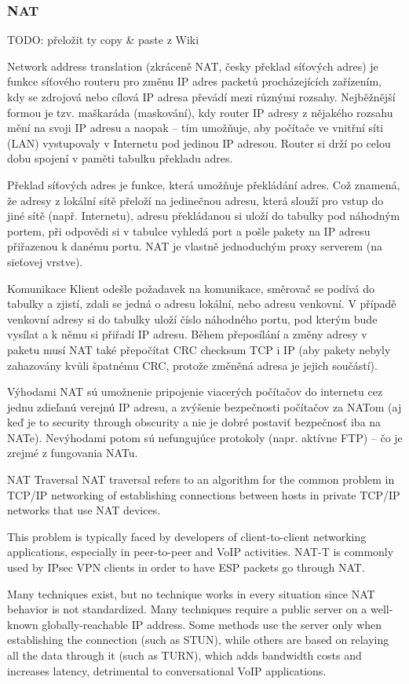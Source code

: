 \subsubsection*{NAT}

TODO: přeložit ty copy \& paste z Wiki

Network address translation (zkráceně NAT, česky překlad síťových adres) je funkce síťového routeru pro změnu IP adres packetů procházejících zařízením, kdy se zdrojová nebo cílová IP adresa převádí mezi různými rozsahy. Nejběžnější formou je tzv. maškaráda (maskování), kdy router IP adresy z nějakého rozsahu mění na svoji IP adresu a naopak -- tím umožňuje, aby počítače ve vnitřní síti (LAN) vystupovaly v Internetu pod jedinou IP adresou. Router si drží po celou dobu spojení v paměti tabulku překladu adres.

Překlad síťových adres je funkce, která umožňuje překládání adres. Což znamená, že adresy z lokální sítě přeloží na jedinečnou adresu, která slouží pro vstup do jiné sítě (např. Internetu), adresu překládanou si uloží do tabulky pod náhodným portem, při odpovědi si v tabulce vyhledá port a pošle pakety na IP adresu přiřazenou k danému portu. NAT je vlastně jednoduchým proxy serverem (na sieťovej vrstve).

\medskip
\begin{obecne}{Komunikace}
Klient odešle požadavek na komunikace, směrovač se podívá do tabulky a zjistí, zdali se jedná o adresu lokální, nebo adresu venkovní. V případě venkovní adresy si do tabulky uloží číslo náhodného portu, pod kterým bude vysílat a k němu si přiřadí IP adresu. Během přeposílání  a změny adresy v paketu musí NAT také přepočítat CRC checksum TCP i IP (aby pakety nebyly zahazovány kvůli špatnému CRC, protože změněná adresa je jejich součástí).

Výhodami NAT sú umožnenie pripojenie viacerých počítačov do internetu cez jednu zdieľanú verejnú IP adresu, a zvýšenie bezpečnosti počítačov za NATom (aj keď je to security through obscurity a nie je dobré postaviť bezpečnosť iba na NATe). Nevýhodami potom sú nefungujúce protokoly (napr. aktívne FTP) -- čo je zrejmé z fungovania NATu.
\end{obecne}

\begin{obecne}{NAT Traversal}
NAT traversal refers to an algorithm for the common problem in TCP/IP networking of establishing connections between hosts in private TCP/IP networks that use NAT devices.

This problem is typically faced by developers of client-to-client networking applications, especially in peer-to-peer and VoIP activities. NAT-T is commonly used by IPsec VPN clients in order to have ESP packets go through NAT.

Many techniques exist, but no technique works in every situation since NAT behavior is not standardized. Many techniques require a public server on a well-known globally-reachable IP address. Some methods use the server only when establishing the connection (such as STUN), while others are based on relaying all the data through it (such as TURN), which adds bandwidth costs and increases latency, detrimental to conversational VoIP applications.
\end{obecne}

